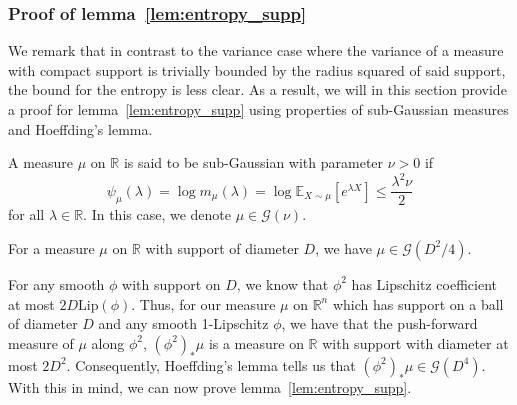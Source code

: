 \subsubsection{Proof of lemma~\ref{lem:entropy_supp}}

We remark that in contrast to the variance case where the variance of a measure with compact 
support is trivially bounded by the radius squared of said support, the bound for the entropy is less 
clear. As a result, we will in this section provide a proof for lemma~\ref{lem:entropy_supp}
using properties of sub-Gaussian measures and Hoeffding's lemma.

\begin{definition}
  A measure \(\mu\) on \(\mathbb{R}\) is said to be sub-Gaussian with parameter \(\nu > 0\) if 
  \[\psi_\mu(\lambda) = \log m_{\mu}(\lambda) = \log \mathbb{E}_{X \sim \mu}[e^{\lambda X}] \le \frac{\lambda^2\nu}{2}\]
  for all \(\lambda \in \mathbb{R}\). In this case, we denote \(\mu \in \mathcal{G}(\nu)\).
\end{definition}



\begin{lemma}
  For a measure \(\mu\) on \(\mathbb{R}\) with support of diameter \(D\), we have \(\mu \in \mathcal{G}(D^2 / 4)\).
\end{lemma}

For any smooth \(\phi\) with support on \(D\), we know that \(\phi^2\) has Lipschitz coefficient 
at most \(2D \text{Lip}(\phi)\). Thus, for our measure \(\mu\) on \(\mathbb{R}^n\) which has support on a ball of diameter \(D\) 
and any smooth 1-Lipschitz \(\phi\), we have that the push-forward measure of \(\mu\) along \(\phi^2\), 
\((\phi^2)_* \mu\) is a measure on \(\mathbb{R}\) with support 
with diameter at most \(2D^2\). Consequently, Hoeffding's lemma tells us that \((\phi^2)_* \mu \in \mathcal{G}(D^4)\).  
With this in mind, we can now prove lemma~\ref{lem:entropy_supp}.

